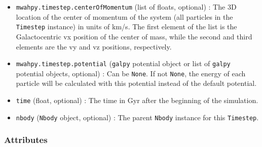 \documentclass{article}
\begin{document}
\begin{itemize}
\item \verb!mwahpy.timestep.centerOfMomentum! (list of floats, optional) : The 3D location of the center of momentum of the system (all particles in the \verb!Timestep! instance) in units of km/s. The first element of the list is the Galactocentric vx position of the center of mass, while the second and third elements are the vy and vz positions, respectively.

\item \verb!mwahpy.timestep.potential! (\verb!galpy! potential object or list of \verb!galpy! potential objects, optional) : Can be \verb!None!. If not \verb!None!, the energy of each particle will be calculated with this potential instead of the default \mwahpy potential. 

\item \verb!time! (float, optional) : The time in Gyr after the beginning of the simulation. 

\item \verb!nbody! (\verb!Nbody! object, optional) : The parent \verb!Nbody! instance for this \verb!Timestep!.

\end{itemize}

\subsubsection{Attributes}
\end{document}
